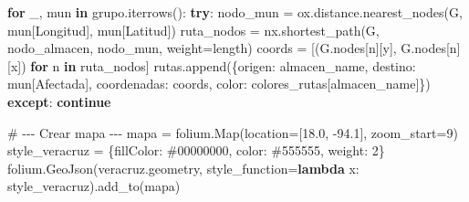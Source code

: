 \documentclass[
  spanish,
  us-letterpaper,
  DIV=11,
  numbers=noendperiod]{scrreprt}
\newenvironment{Shaded}{\begin{snugshade}}{\end{snugshade}}
\newcommand{\CommentTok}[1]{\textcolor[rgb]{0.37,0.37,0.37}{#1}}
\newcommand{\ControlFlowTok}[1]{\textcolor[rgb]{0.00,0.23,0.31}{\textbf{#1}}}
\newcommand{\DecValTok}[1]{\textcolor[rgb]{0.68,0.00,0.00}{#1}}
\newcommand{\FloatTok}[1]{\textcolor[rgb]{0.68,0.00,0.00}{#1}}
\newcommand{\KeywordTok}[1]{\textcolor[rgb]{0.00,0.23,0.31}{\textbf{#1}}}
\newcommand{\NormalTok}[1]{\textcolor[rgb]{0.00,0.23,0.31}{#1}}
\newcommand{\OperatorTok}[1]{\textcolor[rgb]{0.37,0.37,0.37}{#1}}
\newcommand{\StringTok}[1]{\textcolor[rgb]{0.13,0.47,0.30}{#1}}
\numberwithin{equation}{section}
\begin{document}
\begin{Shaded}
\begin{Highlighting}[]
    \ControlFlowTok{for}\NormalTok{ \_, mun }\KeywordTok{in}\NormalTok{ grupo.iterrows():}
        \ControlFlowTok{try}\NormalTok{:}
\NormalTok{            nodo\_mun }\OperatorTok{=}\NormalTok{ ox.distance.nearest\_nodes(G,}
\NormalTok{             mun[}\StringTok{\textquotesingle{}Longitud\textquotesingle{}}\NormalTok{], mun[}\StringTok{\textquotesingle{}Latitud\textquotesingle{}}\NormalTok{])}
\NormalTok{            ruta\_nodos }\OperatorTok{=}\NormalTok{ nx.shortest\_path(G,}
\NormalTok{             nodo\_almacen, nodo\_mun, weight}\OperatorTok{=}\StringTok{\textquotesingle{}length\textquotesingle{}}\NormalTok{)}
\NormalTok{            coords }\OperatorTok{=}\NormalTok{ [(G.nodes[n][}\StringTok{\textquotesingle{}y\textquotesingle{}}\NormalTok{],}
\NormalTok{             G.nodes[n][}\StringTok{\textquotesingle{}x\textquotesingle{}}\NormalTok{]) }\ControlFlowTok{for}\NormalTok{ n }\KeywordTok{in}\NormalTok{ ruta\_nodos]}
\NormalTok{            rutas.append(\{}\StringTok{\textquotesingle{}origen\textquotesingle{}}\NormalTok{: almacen\_name,}
             \StringTok{\textquotesingle{}destino\textquotesingle{}}\NormalTok{: mun[}\StringTok{\textquotesingle{}Afectada\textquotesingle{}}\NormalTok{],}
             \StringTok{\textquotesingle{}coordenadas\textquotesingle{}}\NormalTok{: coords, }
             \StringTok{\textquotesingle{}color\textquotesingle{}}\NormalTok{: colores\_rutas[almacen\_name]\})}
        \ControlFlowTok{except}\NormalTok{:}
            \ControlFlowTok{continue}

\CommentTok{\# {-}{-}{-} Crear mapa {-}{-}{-}}
\NormalTok{mapa }\OperatorTok{=}\NormalTok{ folium.Map(location}\OperatorTok{=}\NormalTok{[}\FloatTok{18.0}\NormalTok{, }\OperatorTok{{-}}\FloatTok{94.1}\NormalTok{], zoom\_start}\OperatorTok{=}\DecValTok{9}\NormalTok{)}
\NormalTok{style\_veracruz }\OperatorTok{=}\NormalTok{ \{}\StringTok{\textquotesingle{}fillColor\textquotesingle{}}\NormalTok{: }\StringTok{\textquotesingle{}\#00000000\textquotesingle{}}\NormalTok{,}
 \StringTok{\textquotesingle{}color\textquotesingle{}}\NormalTok{: }\StringTok{\textquotesingle{}\#555555\textquotesingle{}}\NormalTok{, }\StringTok{\textquotesingle{}weight\textquotesingle{}}\NormalTok{: }\DecValTok{2}\NormalTok{\}}
\NormalTok{folium.GeoJson(veracruz.geometry,}
\NormalTok{ style\_function}\OperatorTok{=}\KeywordTok{lambda}\NormalTok{ x: style\_veracruz).add\_to(mapa)}


\end{Highlighting}
\end{Shaded}
\end{document}
